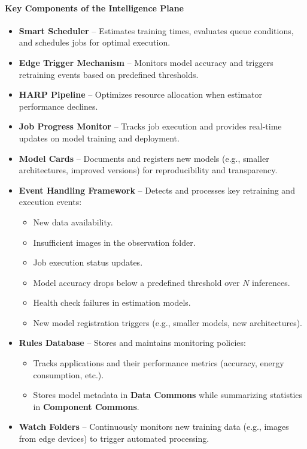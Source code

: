 \paragraph{Key Components of the Intelligence Plane}
\begin{itemize}
    \item \textbf{Smart Scheduler} – Estimates training times, evaluates queue conditions, and schedules jobs for optimal execution.
    \item \textbf{Edge Trigger Mechanism} – Monitors model accuracy and triggers retraining events based on predefined thresholds.
    \item \textbf{HARP Pipeline} – Optimizes resource allocation when estimator performance declines.
    \item \textbf{Job Progress Monitor} – Tracks job execution and provides real-time updates on model training and deployment.
    \item \textbf{Model Cards} – Documents and registers new models (e.g., smaller architectures, improved versions) for reproducibility and transparency.
    \item \textbf{Event Handling Framework} – Detects and processes key retraining and execution events:
    \begin{itemize}
        \item New data availability.
        \item Insufficient images in the observation folder.
        \item Job execution status updates.
        \item Model accuracy drops below a predefined threshold over $N$ inferences.
        \item Health check failures in estimation models.
        \item New model registration triggers (e.g., smaller models, new architectures).
    \end{itemize}
    \item \textbf{Rules Database} – Stores and maintains monitoring policies:
    \begin{itemize}
        \item Tracks applications and their performance metrics (accuracy, energy consumption, etc.).
        \item Stores model metadata in \textbf{Data Commons} while summarizing statistics in \textbf{Component Commons}.
    \end{itemize}
    \item \textbf{Watch Folders} – Continuously monitors new training data (e.g., images from edge devices) to trigger automated processing.

\end{itemize}
